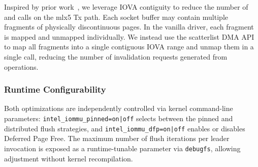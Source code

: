 Inspired by prior work~\cite{Rubin2024FastSafe},
we leverage IOVA contiguity to reduce the number of  and  calls on the mlx5 Tx path.
Each socket buffer may contain multiple fragments of physically discontinuous pages.
In the vanilla driver, each fragment is mapped and unmapped individually.
We instead use the scatterlist DMA API to map all fragments into a single contiguous IOVA range
and unmap them in a single call, reducing the number of invalidation requests
generated from  operations. %




\subsubsection{Runtime Configurability}
Both optimizations are independently controlled via kernel command-line parameters: \texttt{intel\_iommu\_pinned=on|off} selects between the pinned and distributed flush strategies, and
\texttt{intel\_iommu\_dfp=on|off} enables or disables Deferred Page Free.
The maximum number of flush iterations per leader invocation is exposed as a runtime-tunable parameter via \texttt{debugfs}, allowing adjustment without kernel recompilation.
\fi 



